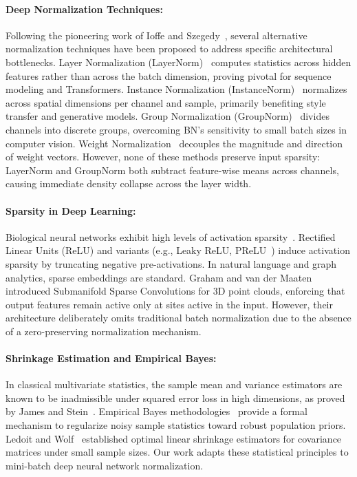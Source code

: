 \documentclass[twocolumn,10pt]{article}
\begin{document}
\paragraph{Deep Normalization Techniques:}
Following the pioneering work of Ioffe and Szegedy~\cite{ioffe2015batch}, several alternative normalization techniques have been proposed to address specific architectural bottlenecks. Layer Normalization (LayerNorm)~\cite{ba2016layer} computes statistics across hidden features rather than across the batch dimension, proving pivotal for sequence modeling and Transformers. Instance Normalization (InstanceNorm)~\cite{ulyanov2016instance} normalizes across spatial dimensions per channel and sample, primarily benefiting style transfer and generative models. Group Normalization (GroupNorm)~\cite{wu2018group} divides channels into discrete groups, overcoming BN's sensitivity to small batch sizes in computer vision. Weight Normalization~\cite{salimans2016weight} decouples the magnitude and direction of weight vectors. However, none of these methods preserve input sparsity: LayerNorm and GroupNorm both subtract feature-wise means across channels, causing immediate density collapse across the layer width.

\paragraph{Sparsity in Deep Learning:}
Biological neural networks exhibit high levels of activation sparsity~\cite{glorot2011deep}. Rectified Linear Units (ReLU) and variants (e.g., Leaky ReLU, PReLU~\cite{he2015delving}) induce activation sparsity by truncating negative pre-activations. In natural language and graph analytics, sparse embeddings are standard. Graham and van der Maaten~\cite{graham2017submanifold} introduced Submanifold Sparse Convolutions for 3D point clouds, enforcing that output features remain active only at sites active in the input. However, their architecture deliberately omits traditional batch normalization due to the absence of a zero-preserving normalization mechanism.

\paragraph{Shrinkage Estimation and Empirical Bayes:}
In classical multivariate statistics, the sample mean and variance estimators are known to be inadmissible under squared error loss in high dimensions, as proved by James and Stein~\cite{james1961estimation}. Empirical Bayes methodologies~\cite{efron2012large} provide a formal mechanism to regularize noisy sample statistics toward robust population priors. Ledoit and Wolf~\cite{ledoit2004well} established optimal linear shrinkage estimators for covariance matrices under small sample sizes. Our work adapts these statistical principles to mini-batch deep neural network normalization.
\end{document}
